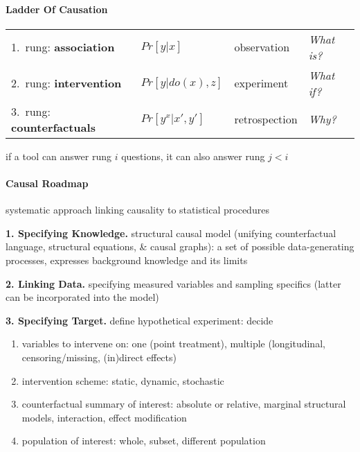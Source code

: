 \documentclass[8pt,twoside]{extarticle}
\begin{document}
\begin{multicols}{2}

\paragraph{Ladder Of Causation} \citep{pearl2019seven}


\begin{minipage}{\textwidth}
\hspace{-0.9em}
\begin{tabular}{l@{\hskip 5pt} l@{\hskip 5pt}l@{\hskip 5pt}l@{\hskip 5pt}}
1.\ rung: \textbf{association} & $Pr\left[y|x\right]$ & observation & \textit{What is?} \\
2.\ rung: \textbf{intervention} & $Pr\left[y|do(x),z\right]$ & experiment & \textit{What if?} \\
3.\ rung: \textbf{counterfactuals} & $Pr\left[y^x|x',y'\right]$ & retrospection & \textit{Why?}
\end{tabular}
\end{minipage}
if a tool can answer rung $i$ questions, it can also answer rung $j<i$


\paragraph{Causal Roadmap} \citep{petersen2014causal} 
systematic approach linking causality to statistical procedures

 \textbf{1. Specifying Knowledge.} structural causal model (unifying counterfactual language, structural equations, \& causal graphs): a set of possible data-generating processes, expresses background knowledge and its limits

 \textbf{2. Linking Data.} specifying measured variables and sampling specifics (latter can be incorporated into the model)

 \textbf{3. Specifying Target.} define hypothetical experiment: decide
\begin{enumerate}[itemsep=0em, topsep=0pt, partopsep=0pt,parsep=0pt]
\setlength{\itemsep}{0pt}%
\setlength{\parskip}{0pt}
\item variables to intervene on: one (point treatment), multiple (longitudinal, censoring/missing, (in)direct effects)
\item intervention scheme: static, dynamic, stochastic
\item counterfactual summary of interest: absolute or relative, marginal structural models, interaction, effect modification
\item population of interest: whole, subset, different population
\end{enumerate}


\end{multicols}
\end{document}
